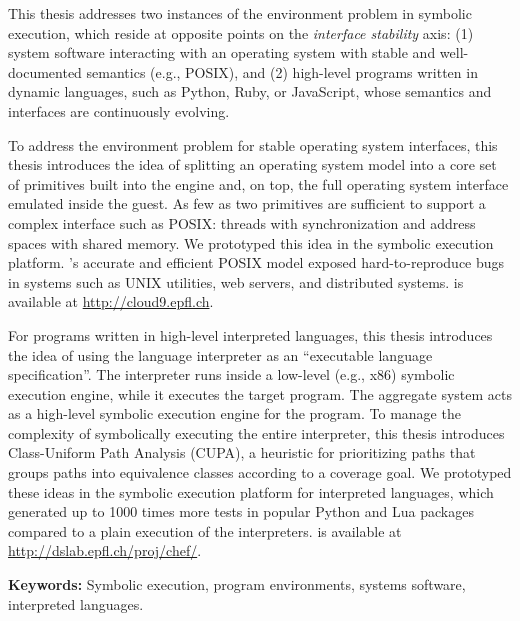 This thesis addresses two instances of the environment problem in symbolic execution, which reside at opposite points on the \emph{interface stability} axis: (1) system software interacting with an operating system with stable and well-documented semantics (e.g., POSIX), and (2) high-level programs written in dynamic languages, such as Python, Ruby, or JavaScript, whose semantics and interfaces are continuously evolving.

To address the environment problem for stable operating system interfaces, this thesis introduces the idea of splitting an operating system model into a core set of primitives built into the engine and, on top, the full operating system interface emulated inside the guest.
%
As few as two primitives are sufficient to support a complex interface such as POSIX: threads with synchronization and address spaces with shared memory.
%
We prototyped this idea in the \emph{\cnine} symbolic execution platform. \cnine's accurate and efficient POSIX model exposed hard-to-reproduce bugs in systems such as UNIX utilities, web servers, and distributed systems.
%
\cnine is available at {\url{http://cloud9.epfl.ch}}.

For programs written in high-level interpreted languages, this thesis introduces the idea of using the language interpreter as an ``executable language specification''.  The interpreter runs inside a low-level (e.g., x86) symbolic execution engine, while it executes the target program.  The aggregate system acts as a high-level symbolic execution engine for the program.
%
To manage the complexity of symbolically executing the entire interpreter, this thesis introduces Class-Uniform Path Analysis (CUPA), a heuristic for prioritizing paths that groups paths into equivalence classes according to a coverage goal.
%
We prototyped these ideas in the \emph{\chef} symbolic execution platform for interpreted languages, which generated up to 1000 times more tests in popular Python and Lua packages compared to a plain execution of the interpreters.
%
\chef is available at {\url{http://dslab.epfl.ch/proj/chef/}}.

\noindent \textbf{Keywords:} Symbolic execution, program environments, systems software, interpreted languages.



